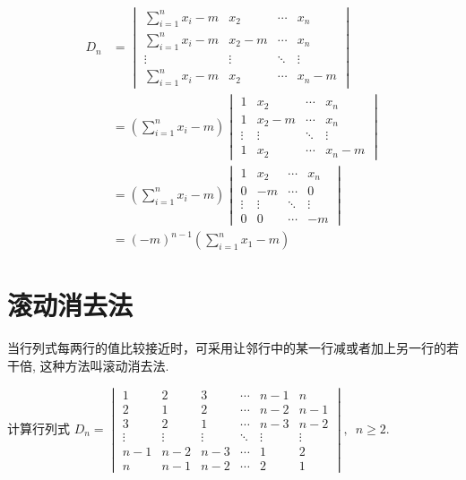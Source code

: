 \begin{solution}
    \begin{align*}
        D_n&=\begin{vmatrix}
            \displaystyle\sum_{i=1}^{n} x_i-m & x_2 & \cdots & x_n \\
            \displaystyle\sum_{i=1}^{n} x_i-m & x_2-m & \cdots & x_n \\
            \vdots & \vdots & \ddots & \vdots \\
            \displaystyle\sum_{i=1}^{n} x_i-m & x_2 & \cdots & x_n-m
        \end{vmatrix} \\
        &=\left(\sum_{i=1}^{n} x_i-m\right)
        \begin{vmatrix}
            1 & x_2 & \cdots & x_n \\
            1 & x_2-m & \cdots & x_n \\
            \vdots & \vdots & \ddots & \vdots \\
            1 & x_2 & \cdots & x_n-m
        \end{vmatrix} \\
        &=\left(\sum_{i=1}^{n} x_i-m\right)
        \begin{vmatrix}
            1 & x_2 & \cdots & x_n \\
            0 & -m & \cdots & 0 \\
            \vdots & \vdots & \ddots & \vdots \\
            0 & 0 & \cdots & -m
        \end{vmatrix}\\
        &=(-m)^{n-1}\left(\sum_{i=1}^{n} x_1-m\right)
    \end{align*}
\end{solution}

\section{滚动消去法}
当行列式每两行的值比较接近时，可采用让邻行中的某一行减或者加上另一行的若干倍, 这种方法叫滚动消去法.

\begin{example}
    计算行列式
    $D_n=\begin{vmatrix}
        1 & 2 & 3 & \cdots & n-1 & n \\
        2 & 1 & 2 & \cdots & n-2 & n-1 \\
        3 & 2 & 1 & \cdots & n-3 & n-2 \\
        \vdots & \vdots & \vdots & \ddots & \vdots & \vdots \\
        n-1 & n-2 & n-3 & \cdots & 1 & 2\\
        n & n-1 & n-2 & \cdots & 2 & 1
    \end{vmatrix},\enspace n \geq 2$.
\end{example}

